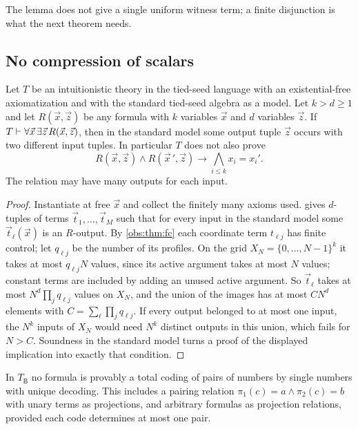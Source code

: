 The lemma does not give a single uniform witness term; a finite disjunction is
what the next theorem needs.

\subsection{No compression of scalars}

\begin{theorem}
\label{obs:thm:no-compression}
Let $T$ be an intuitionistic theory in the tied-seed language with an
existential-free axiomatization and with the standard tied-seed algebra as a
model. Let $k>d\ge 1$ and let $R(\vec x,\vec z)$ be any formula with $k$
variables $\vec x$ and $d$ variables $\vec z$. If
$T\vdash\forall\vec x\,\exists\vec z\,R(\vec x,\vec z)$, then in the standard
model some output tuple $\vec z$ occurs with two different input tuples. In
particular $T$ does not also prove
\[
R(\vec x,\vec z)\wedge R(\vec x\,',\vec z)\to\bigwedge_{i\le k}x_i=x_i' .
\]
The relation may have many outputs for each input.
\end{theorem}

\begin{proof}
Instantiate at free $\vec x$ and collect the finitely many axioms used.
 gives $d$-tuples of terms
$\vec t_1,\dots,\vec t_M$ such that for every input in the standard model some
$\vec t_\ell(\vec x)$ is an $R$-output. By \cref{obs:thm:fc} each coordinate
term $t_{\ell j}$ has finite control; let $q_{\ell j}$ be the number of its
profiles. On the grid $X_N=\{0,\dots,N-1\}^k$ it takes at most $q_{\ell j}N$
values, since its active argument takes at most $N$ values; constant terms are
included by adding an unused active argument. So $\vec t_\ell$ takes at most
$N^d\prod_j q_{\ell j}$ values on $X_N$, and the union of the images has at
most $CN^d$ elements with $C=\sum_\ell\prod_j q_{\ell j}$. If every output
belonged to at most one input, the $N^k$ inputs of $X_N$ would need $N^k$
distinct outputs in this union, which fails for $N>C$. Soundness in the
standard model turns a proof of the displayed implication into exactly that
condition.
\end{proof}

\begin{corollary}
\label{obs:cor:no-pairing}
In $T_{\mathsf{B}}$ no formula is provably a total coding of pairs of numbers
by single numbers with unique decoding. This includes a pairing relation
$\pi_1(c)=a\wedge\pi_2(c)=b$ with unary terms as projections, and arbitrary
formulas as projection relations, provided each code determines at most one
pair.
\end{corollary}

